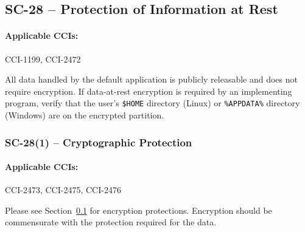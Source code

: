 \documentclass[letterpaper, 10pt, twoside]{article}
\begin{document}
\subsection{SC-28 -- Protection of Information at Rest}
\label{sec:sc-28}

\paragraph{Applicable CCIs:} CCI-1199, CCI-2472

All data handled by the default application is publicly releasable and does not require encryption. If data-at-rest encryption is required by an implementing program, verify that the user's \texttt{\$HOME} directory (Linux) or \texttt{\%APPDATA\%} directory (Windows) are on the encrypted partition.

\subsubsection{SC-28(1) -- Cryptographic Protection}

\paragraph{Applicable CCIs:} CCI-2473, CCI-2475, CCI-2476

Please see Section~\ref{sec:sc-28} for encryption protections. Encryption should be commensurate with the protection required for the data.

\clearpage
\printbibliography
\end{document}
